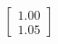 \documentclass[preview]{standalone}
\begin{document}
\begin{align*}
\begin{bmatrix} 1.00 \\ 1.05 \end{bmatrix}
\end{align*}
\end{document}
